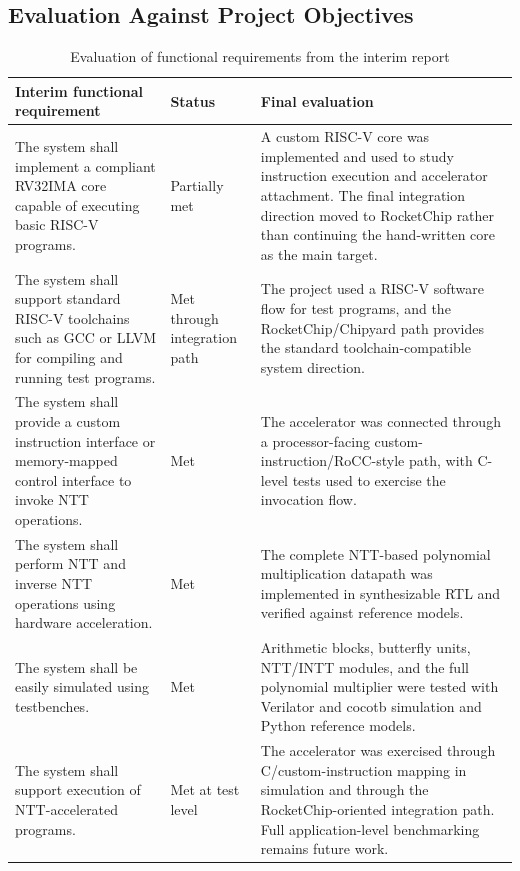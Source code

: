 \documentclass[a4paper, 12pt, titlepage]{article}
\begin{document}
\subsection{Evaluation Against Project Objectives}

\begin{table}[H]
\centering
\scriptsize
\setlength{\tabcolsep}{3pt}
\renewcommand{\arraystretch}{1.05}
\caption{Evaluation of functional requirements from the interim report}
\label{tab:functional-requirements-eval}
\begin{tabularx}{\textwidth}{|>{\raggedright\arraybackslash}p{}|>{\centering\arraybackslash}p{}|>{\raggedright\arraybackslash}X|}
\hline
Interim functional requirement & Status & Final evaluation \\
\hline
The system shall implement a compliant RV32IMA core capable of executing basic RISC-V programs. & Partially met & A custom RISC-V core was implemented and used to study instruction execution and accelerator attachment. The final integration direction moved to RocketChip rather than continuing the hand-written core as the main target. \\
\hline
The system shall support standard RISC-V toolchains such as GCC or LLVM for compiling and running test programs. & Met through integration path & The project used a RISC-V software flow for test programs, and the RocketChip/Chipyard path provides the standard toolchain-compatible system direction. \\
\hline
The system shall provide a custom instruction interface or memory-mapped control interface to invoke NTT operations. & Met & The accelerator was connected through a processor-facing custom-instruction/RoCC-style path, with C-level tests used to exercise the invocation flow. \\
\hline
The system shall perform NTT and inverse NTT operations using hardware acceleration. & Met & The complete NTT-based polynomial multiplication datapath was implemented in synthesizable RTL and verified against reference models. \\
\hline
The system shall be easily simulated using testbenches. & Met & Arithmetic blocks, butterfly units, NTT/INTT modules, and the full polynomial multiplier were tested with Verilator and cocotb simulation and Python reference models. \\
\hline
The system shall support execution of NTT-accelerated programs. & Met at test level & The accelerator was exercised through C/custom-instruction mapping in simulation and through the RocketChip-oriented integration path. Full application-level benchmarking remains future work. \\

\end{tabularx}
\end{table}
\end{document}
